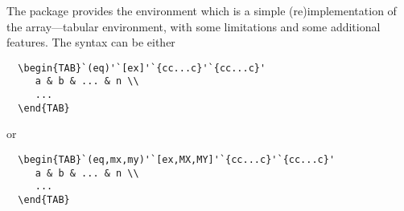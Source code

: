 \documentclass[a4paper,final,11pt]{article}
\begin{document}
The package  provides the  environment
which is a simple (re)\-implementation of the array---tabular environment,
with some limitations and some additional features.
The syntax can be either
\begin{verbatim}
  \begin{TAB}`(eq)'`[ex]'`{cc...c}'`{cc...c}'
     a & b & ... & n \\
     ...
  \end{TAB}
\end{verbatim}
or
\begin{verbatim}
  \begin{TAB}`(eq,mx,my)'`[ex,MX,MY]'`{cc...c}'`{cc...c}'
     a & b & ... & n \\
     ...
  \end{TAB}
\end{verbatim}
\end{document}
